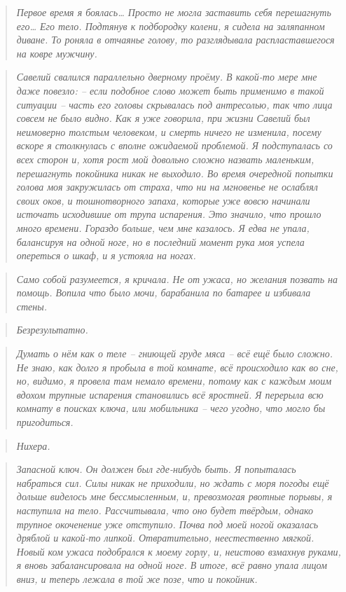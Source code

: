\documentclass[
  a5paperpaper,
  DIV=11,
  numbers=noendperiod]{scrreprt}
\begin{document}
\begin{quote}
\emph{Первое время я боялась\ldots{} Просто не могла заставить себя
перешагнуть его\ldots{} Его тело. Подтянув к подбородку колени, я сидела
на заляпанном диване. То роняла в отчаянье голову, то разглядывала
распластавшегося на ковре мужчину.}
\end{quote}

\begin{quote}
\emph{Савелий свалился параллельно дверному проёму. В какой-то мере мне
даже повезло: -- если подобное слово может быть применимо в такой
ситуации -- часть его головы скрывалась под антресолью, так что лица
совсем не было видно. Как я уже говорила, при жизни Савелий был
неимоверно толстым человеком, и смерть ничего не изменила, посему вскоре
я столкнулась с вполне ожидаемой проблемой. Я подступалась со всех
сторон и, хотя рост мой довольно сложно назвать маленьким, перешагнуть
покойника никак не выходило. Во время очередной попытки голова моя
закружилась от страха, что ни на мгновенье не ослаблял своих оков, и
тошнотворного запаха, которые уже вовсю начинали источать исходившие от
трупа испарения. Это значило, что прошло много времени. Гораздо больше,
чем мне казалось. Я едва не упала, балансируя на одной ноге, но в
последний момент рука моя успела опереться о шкаф, и я устояла на
ногах.}
\end{quote}

\begin{quote}
\emph{Само собой разумеется, я кричала. Не от ужаса, но желания позвать
на помощь. Вопила что было мочи, барабанила по батарее и избивала
стены.}
\end{quote}

\begin{quote}
\emph{Безрезультатно.}
\end{quote}

\begin{quote}
\emph{Думать о нём как о теле -- гниющей груде мяса -- всё ещё было
сложно. Не знаю, как долго я пробыла в той комнате, всё происходило как
во сне, но, видимо, я провела там немало времени, потому как с каждым
моим вдохом трупные испарения становились всё яростней. Я перерыла всю
комнату в поисках ключа, или мобильника -- чего угодно, что могло бы
пригодиться.}
\end{quote}

\begin{quote}
\emph{Нихера.}
\end{quote}

\begin{quote}
\emph{Запасной ключ. Он должен был где-нибудь быть. Я попыталась
набраться сил. Силы никак не приходили, но ждать с моря погоды ещё
дольше виделось мне бессмысленным, и, превозмогая рвотные порывы, я
наступила на тело. Рассчитывала, что оно будет твёрдым, однако трупное
окоченение уже отступило. Почва под моей ногой оказалась дряблой и
какой-то липкой. Отвратительно, неестественно мягкой. Новый ком ужаса
подобрался к моему горлу, и, неистово взмахнув руками, я вновь
забалансировала на одной ноге. В итоге, всё равно упала лицом вниз, и
теперь лежала в той же позе, что и покойник.}
\end{quote}
\end{document}
